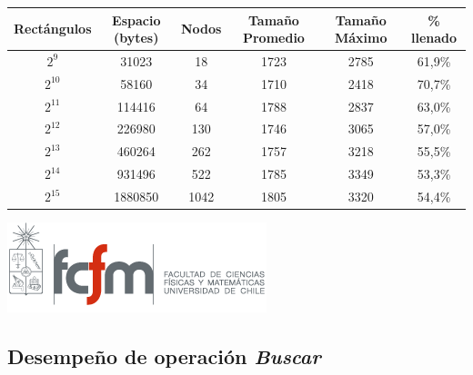 \documentclass[letterpaper,10pt]{article}
\begin{document}
	\begin{center}

		\begin{tabular}{|c|c|c|c|c|c|}
			\hline
			Rectángulos	& Espacio (bytes) & Nodos & Tamaño Promedio & Tamaño Máximo & \% llenado\\
			\hline
			$2^{9}$ 	& 31023 & 18 & 1723 & 2785 & 61,9\%\\
			\hline
			$2^{10}$ 	& 58160 & 34 & 1710 & 2418 & 70,7\%\\
			\hline
			$2^{11}$ 	& 114416 & 64 & 1788 & 2837 & 63,0\%\\
			\hline
			$2^{12}$ 	& 226980 & 130 & 1746 & 3065 & 57,0\%\\
			\hline
			$2^{13}$ 	& 460264 & 262 & 1757 & 3218 & 55,5\%\\
			\hline
			$2^{14}$ 	& 931496 & 522 & 1785 & 3349 & 53,3\%\\
			\hline
			$2^{15}$ 	& 1880850 & 1042 & 1805 & 3320 & 54,4\%\\
			\hline
		\end{tabular}

		\includegraphics{logoFCFM.png}
	\end{center}

	\subsection{Desempeño de operación \textit{Buscar}}
\end{document}
